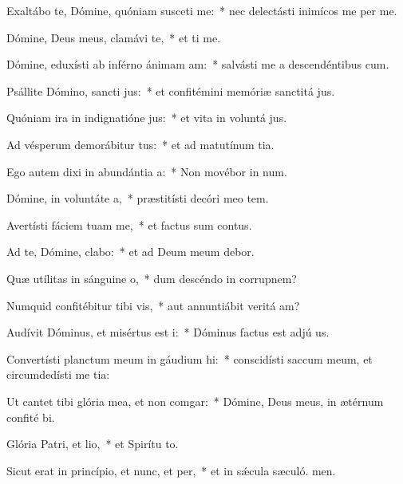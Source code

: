 \item Exaltábo te, Dómine, quóniam susceti me:~* nec delectásti inimícos me per me.
\item Dómine, Deus meus, clamávi  te,~* et ti me.
\item Dómine, eduxísti ab inférno ánimam am:~* salvásti me a descendéntibus  cum.
\item Psállite Dómino, sancti jus:~* et confitémini memóriæ sanctitá jus.
\item Quóniam ira in indignatióne jus:~* et vita in voluntá jus.
\item Ad vésperum demorábitur tus:~* et ad matutínum tia.
\item Ego autem dixi in abundántia a:~* Non movébor in num.
\item Dómine, in voluntáte a,~* præstitísti decóri meo tem.
\item Avertísti fáciem tuam  me,~* et factus sum contus.
\item Ad te, Dómine, clabo:~* et ad Deum meum debor.
\item Quæ utílitas in sánguine o,~* dum descéndo in corrupnem?
\item Numquid confitébitur tibi vis,~* aut annuntiábit veritá am?
\item Audívit Dóminus, et misértus est i:~* Dóminus factus est adjú us.
\item Convertísti planctum meum in gáudium hi:~* conscidísti saccum meum, et circumdedísti me tia:
\item Ut cantet tibi glória mea, et non comgar:~* Dómine, Deus meus, in ætérnum confité bi.
\item Glória Patri, et lio,~* et Spirítu to.
\item Sicut erat in princípio, et nunc, et per,~* et in sǽcula sæculó. men.
